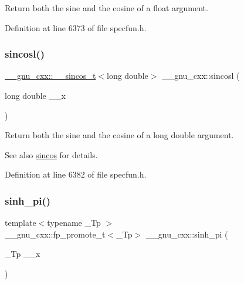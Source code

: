 Return both the sine and the cosine of a {\ttfamily float} argument. 

Definition at line 6373 of file specfun.\+h.

\mbox{\label{group__gnu__math__spec__func_ga96a7222e47d430a228973658ca9f6f35}} 
\subsubsection{\texorpdfstring{sincosl()}{sincosl()}}
{\footnotesize\ttfamily \hyperlink{struct____gnu__cxx_1_1____sincos__t}{\+\_\+\+\_\+gnu\+\_\+cxx\+::\+\_\+\+\_\+sincos\+\_\+t}$<$long double$>$ \+\_\+\+\_\+gnu\+\_\+cxx\+::sincosl (\begin{DoxyParamCaption}\item[{long double}]{\+\_\+\+\_\+x }\end{DoxyParamCaption})\hspace{0.3cm}{\ttfamily [inline]}}

Return both the sine and the cosine of a {\ttfamily  long double } argument.

\begin{DoxySeeAlso}{See also}
\hyperlink{group__gnu__math__spec__func_ga8041c24b528475bcf8a4178e484652a3}{sincos} for details. 
\end{DoxySeeAlso}


Definition at line 6382 of file specfun.\+h.

\mbox{\label{group__gnu__math__spec__func_gade43453b87b6b38c05b3fcce40870542}} 
\subsubsection{\texorpdfstring{sinh\+\_\+pi()}{sinh\_pi()}}
{\footnotesize\ttfamily template$<$typename \+\_\+\+Tp $>$ \\
\+\_\+\+\_\+gnu\+\_\+cxx\+::fp\+\_\+promote\+\_\+t$<$\+\_\+\+Tp$>$ \+\_\+\+\_\+gnu\+\_\+cxx\+::sinh\+\_\+pi (\begin{DoxyParamCaption}\item[{\+\_\+\+Tp}]{\+\_\+\+\_\+x }\end{DoxyParamCaption})\hspace{0.3cm}{\ttfamily [inline]}}

